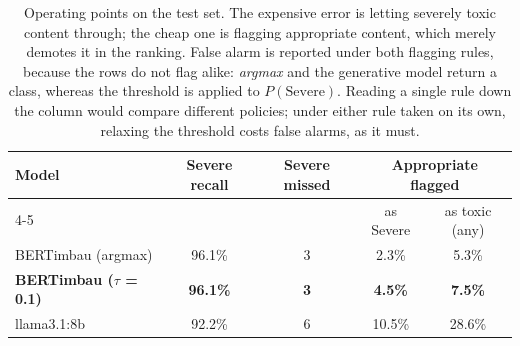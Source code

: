 \begin{table}[!t]
\centering
\caption{Operating points on the test set. The expensive error is letting severely toxic content through; the cheap one is flagging appropriate content, which merely demotes it in the ranking. False alarm is reported under both flagging rules, because the rows do not flag alike: \emph{argmax} and the generative model return a class, whereas the threshold is applied to $P(\text{Severe})$. Reading a single rule down the column would compare different policies; under either rule taken on its own, relaxing the threshold costs false alarms, as it must.}
\label{tab:pontos-operacao}
\begin{tabular}{lcccc}
\toprule
Model & Severe recall & Severe missed & \multicolumn{2}{c}{Appropriate flagged} \\
\cmidrule(lr){4-5}
 & & & as Severe & as toxic (any)  \\
\midrule
BERTimbau (argmax) & 96.1\% & 3 & 2.3\% & 5.3\% \\
\textbf{BERTimbau ($\tau$ = 0.1)} & \textbf{96.1\%} & \textbf{3} & \textbf{4.5\%} & \textbf{7.5\%} \\
llama3.1:8b & 92.2\% & 6 & 10.5\% & 28.6\% \\
\bottomrule
\end{tabular}
\end{table}
